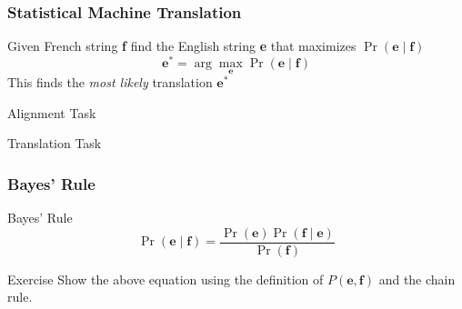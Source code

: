 \begin{frame}
\frametitle{Statistical Machine Translation}
\begin{block}{}
Given French string \textbf{f} find the English string \textbf{e} that maximizes $\Pr(\textbf{e} \mid \textbf{f})$
\[ \textbf{e}^\ast = \arg\max_{\textbf{e}} \Pr(\textbf{e} \mid \textbf{f}) \]
This finds the \textit{most likely} translation $\textbf{e}^\ast$
\end{block}
\end{frame}

\begin{frame}
\def\blockdist{2.0}
\begin{alertblock}{Alignment Task}
\end{alertblock}
\begin{alertblock}{Translation Task}
\end{alertblock}
\end{frame}

\begin{frame}
\frametitle{Bayes' Rule}
\begin{block}{Bayes' Rule}
\[ \Pr( \textbf{e} \mid \textbf{f} ) = \frac{ \Pr(\textbf{e}) \Pr(\textbf{f} \mid \textbf{e}) }{ \Pr(\textbf{f}) } \]
\end{block}\pause
\begin{block}{Exercise}
Show the above equation using the definition of $P(\textbf{e}, \textbf{f})$ and the chain rule.
\end{block}
\end{frame}

